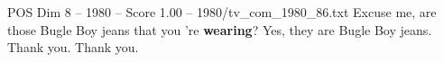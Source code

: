 \begin{textsample}{POS Dim 8 – 1980 – Score 1.00 – 1980/tv\_com\_1980\_86.txt}  \label{ex:f8_pos_046}
Excuse me, are those Bugle Boy jeans that you 're \textbf{wearing}?
Yes, they are Bugle Boy jeans.
Thank you.
Thank you.

\end{textsample}
